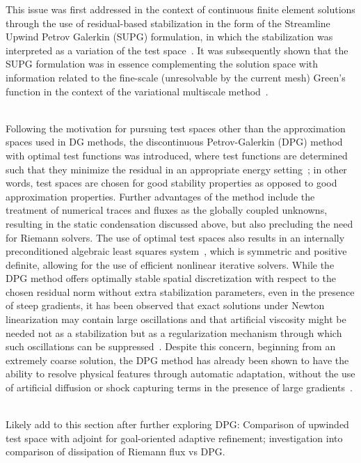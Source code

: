 \documentclass[12pt,Bold,letterpaper,TexShade]{mcgilletdclass}
\numberwithin{equation}{section}
\begin{document}
This issue was first addressed in the context of continuous finite element solutions through the use of residual-based stabilization in the form of the Streamline Upwind Petrov Galerkin (SUPG) formulation, in which the stabilization was interpreted as a variation of the test space~\cite{brooks1982}. It was subsequently shown that the SUPG formulation was in essence complementing the solution space with information related to the fine-scale (unresolvable by the current mesh) Green's function in the context of the variational multiscale method~\cite{hughes1998,hughes2007}.
\\~

Following the motivation for pursuing test spaces other than the approximation spaces used in DG methods, the discontinuous Petrov-Galerkin (DPG) method with optimal test functions was introduced, where test functions are determined such that they minimize the residual in an appropriate energy setting~\cite{demkowicz2010,demkowicz2011}; in other words, test spaces are chosen for good stability properties as opposed to good approximation properties. Further advantages of the method include the treatment of numerical traces and fluxes as the globally coupled unknowns, resulting in the static condensation discussed above, but also precluding the need for Riemann solvers. The use of optimal test spaces also results in an internally preconditioned algebraic least squares system~\cite{chan2014}, which is symmetric and positive definite, allowing for the use of efficient nonlinear iterative solvers. While the DPG method offers optimally stable spatial discretization with respect to the chosen residual norm without extra stabilization parameters, even in the presence of steep gradients, it has been observed that exact solutions under Newton linearization may contain large oscillations and that artificial viscosity might be needed not as a stabilization but as a regularization mechanism through which such oscillations can be suppressed~\cite{chan_thesis}. Despite this concern, beginning from an extremely coarse solution, the DPG method has already been shown to have the ability to resolve physical features through automatic adaptation, without the use of artificial diffusion or shock capturing terms in the presence of large gradients~\cite{chan2014}.
\\~

{\color{red} Likely add to this section after further exploring DPG: Comparison of upwinded test space with adjoint for goal-oriented adaptive refinement; investigation into comparison of dissipation of Riemann flux vs DPG.}
\end{document}
